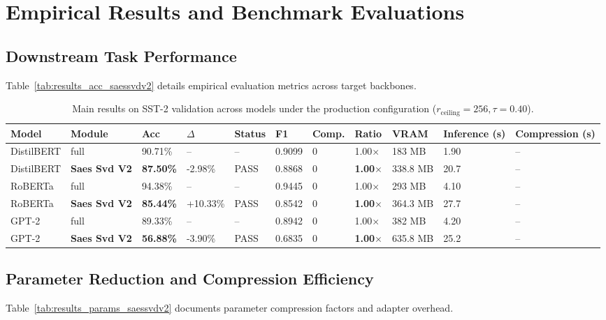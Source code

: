 \section{Empirical Results and Benchmark Evaluations}

\subsection{Downstream Task Performance}
Table~\ref{tab:results_acc_saessvdv2} details empirical evaluation metrics across target backbones.

\begin{table}[t]
\centering
\small
\begin{tabular}{lllllllllll}
\toprule
\textbf{Model} & \textbf{Module} & \textbf{Acc} & \textbf{$\Delta$} & \textbf{Status} & \textbf{F1} & \textbf{Comp.} & \textbf{Ratio} & \textbf{VRAM} & \textbf{Inference (s)} & \textbf{Compression (s)} \\
\midrule
DistilBERT & full & 90.71\% & -- & -- & 0.9099 & 0 & 1.00$\times$ & 183 MB & 1.90 & -- \\
DistilBERT & \textbf{Saes Svd V2} & \textbf{87.50\%} & -2.98\% & PASS & 0.8868 & 0 & \textbf{1.00$\times$} & 338.8 MB & 20.7 & -- \\
RoBERTa & full & 94.38\% & -- & -- & 0.9445 & 0 & 1.00$\times$ & 293 MB & 4.10 & -- \\
RoBERTa & \textbf{Saes Svd V2} & \textbf{85.44\%} & +10.33\% & PASS & 0.8542 & 0 & \textbf{1.00$\times$} & 364.3 MB & 27.7 & -- \\
GPT-2 & full & 89.33\% & -- & -- & 0.8942 & 0 & 1.00$\times$ & 382 MB & 4.20 & -- \\
GPT-2 & \textbf{Saes Svd V2} & \textbf{56.88\%} & -3.90\% & PASS & 0.6835 & 0 & \textbf{1.00$\times$} & 635.8 MB & 25.2 & -- \\
\bottomrule
\end{tabular}
\caption{Main results on SST-2 validation across models under the production configuration ($r_{\mathrm{ceiling}}=256, \tau=0.40$).}
\label{tab:main_sst2}
\end{table}

\subsection{Parameter Reduction and Compression Efficiency}
Table~\ref{tab:results_params_saessvdv2} documents parameter compression factors and adapter overhead.

